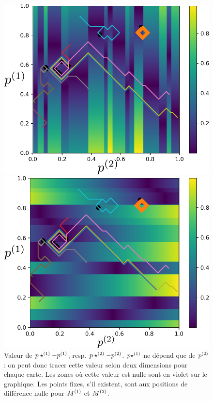 \begin{figure}
\begin{minipage}{0.5\textwidth}
\centering
\includegraphics[width=\textwidth]{champ_X_006_t1.pdf}
\end{minipage}
\begin{minipage}{0.5\textwidth}
\centering
\includegraphics[width=\textwidth]{champ_Y_006_t1.pdf}
\end{minipage}
\caption{Valeur de $p\star^{({1})} - p^{({1})}$, resp. $p\star^{({2})} - p^{({2})}$. $p\star^{({1})}$ ne dépend que de $p^{({2})}$ : on peut donc tracer cette valeur selon deux dimensions pour chaque carte. Les zones où cette valeur est nulle sont en violet sur le graphique. Les points fixes, s'il existent, sont aux positions de différence nulle pour $M^{({1})}$ et $M^{({2})}$.}
\label{fig:diff_relax_t1}
\end{figure}

